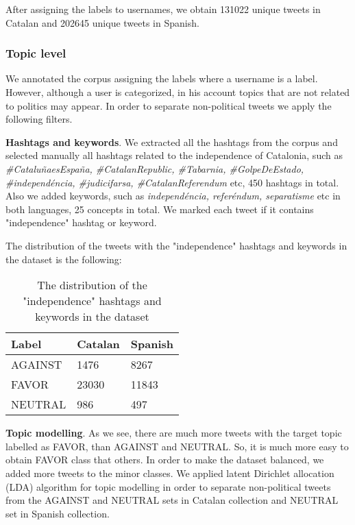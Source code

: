 \documentclass[10pt, a4paper]{article}
\begin{document}
After assigning the labels to usernames, we obtain 131022 unique tweets in Catalan and 202645 unique tweets in Spanish. 

\subsubsection{Topic level} 

We annotated the corpus assigning the labels where a username is a label. However, although a user is categorized, in his account topics that are not related to politics may appear. In order to separate non-political tweets we apply the following filters. 

\textbf{Hashtags and keywords}. We extracted all the hashtags from the corpus and selected manually all hashtags related to the independence of Catalonia, such as \textit{\#Catalu\~naesEspa\~na, \#CatalanRepublic, \#Tabarnia, \#GolpeDeEstado, \#independ\'encia, \#judicifarsa, \#CatalanReferendum} etc, 450 hashtags in total. Also we added keywords, such as \textit{independ\'encia, refer\'endum, separatisme} etc in both languages, 25 concepts in total. We marked each tweet if it contains "independence" hashtag or keyword. 

The distribution of the tweets with the "independence" hashtags and keywords in the dataset is the following: 

\begin{table}[!h]
\begin{center}
\begin{tabularx}{\columnwidth}{|l|l|X|}

      \hline
        Label&Catalan&Spanish\\
      \hline
        AGAINST & 1476&8267\\
      \hline
        FAVOR & 23030&11843\\
      \hline
        NEUTRAL & 986&497\\
      \hline

\end{tabularx}
\caption{The distribution of the "independence" hashtags and keywords in the dataset}
 \end{center}
\end{table}

\textbf{Topic modelling}. As we see, there are much more tweets with the target topic labelled as FAVOR, than AGAINST and NEUTRAL. So, it is much more easy to obtain FAVOR class that others. In order to make the dataset balanced, we added more tweets to the minor classes. We applied latent Dirichlet allocation (LDA) \cite{Blei:2003:LDA:944919.944937} algorithm for topic modelling in order to separate non-political tweets from the AGAINST and NEUTRAL sets in Catalan collection and NEUTRAL set in Spanish collection. 
\end{document}
